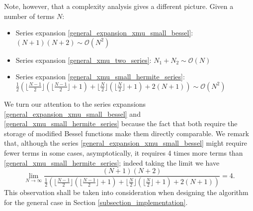 \documentclass[10pt,a4paper,oneside]{article}
\numberwithin{equation}{section}
\begin{document}

\begin{table}[H]
	\centering
	\caption{Comparison on the number of terms to achieve machine precision with the three series expansions for $|x-\mu| \to 0$.}
	\label{table_xmu_general_n_terms}
\end{table}

Note, however, that a complexity analysis gives a different picture. Given a number of terms $N$:
\begin{itemize}
\item Series expansion \eqref{general_expansion_xmu_small_bessel}: $(N + 1) (N + 2) \sim \mathcal{O}(N^2)$
\item Series expansion \eqref{general_xmu_two_series}: $N_1 + N_2 \sim \mathcal{O}(N)$
\item Series expansion \eqref{general_xmu_small_hermite_series}: $\frac{1}{2}\left(\lfloor\frac{N - 1}{2} \rfloor \left(\lfloor\frac{N - 1}{2} \rfloor + 1\right) + \lfloor\frac{N}{2} \rfloor \left(\lfloor\frac{N}{2} \rfloor + 1\right) + 2 (N + 1)\right) \sim \mathcal{O}(N^2)$
\end{itemize}
We turn our attention to the series expansions \eqref{general_expansion_xmu_small_bessel} and \eqref{general_xmu_small_hermite_series} because the fact that both require the storage of modified Bessel functions make them directly comparable. We remark that, although the series \eqref{general_expansion_xmu_small_bessel} might require fewer terms in some cases, asymptotically, it requires 4 times more terms than \eqref{general_xmu_small_hermite_series}; indeed taking the limit we have
\begin{equation*}
\lim_{N\to\infty} \frac{(N + 1) (N + 2)}{\frac{1}{2}\left(\lfloor\frac{N - 1}{2} \rfloor \left(\lfloor\frac{N - 1}{2} \rfloor + 1\right) + \lfloor\frac{N}{2} \rfloor \left(\lfloor\frac{N}{2} \rfloor + 1\right) + 2 (N + 1)\right)} = 4.
\end{equation*}
This observation shall be taken into consideration when designing the algorithm for the general case in Section \ref{subsection_implementation}.
\end{document}
